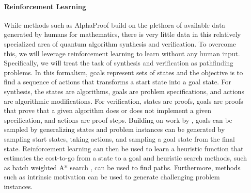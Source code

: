 \documentclass[letterpaper]{article} %
\begin{document}
\paragraph{Reinforcement Learning}
While methods such as AlphaProof build on the plethora of available data generated by humans for mathematics, there is very little data in this relatively specialized area of quantum algorithm synthesis and verification. To overcome this, we will leverage reinforcement learning to learn without any human input. Specifically, we will treat the task of synthesis and verification as pathfinding problems. In this formalism, goals represent sets of states and the objective is to find a sequence of actions that transforms a start state into a goal state. For synthesis, the states are algorithms, goals are problem specifications, and actions are algorithmic modifications. For verification, states are proofs, goals are proofs that prove that a given algorithm does or does not implement a given specification, and actions are proof steps. Building on work by \citet{agostinelli2024specifying}, goals can be sampled by generalizing states and problem instances can be generated by sampling start states, taking actions, and sampling a goal state from the final state. Reinforcement learning can then be used to learn a heuristic function that estimates the cost-to-go from a state to a goal and heuristic search methods, such as batch weighted A* search \cite{hart1968formal, agostinelli2019solving, li2022optimal}, can be used to find paths. Furthermore, methods such as intrinsic motivation \cite{singh2010intrinsically} can be used to generate challenging problem instances.

\end{document}

